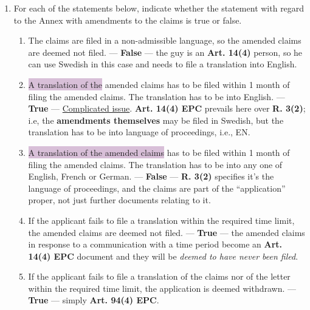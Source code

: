 \documentclass{report}
\begin{document}
\begin{enumerate}[label=\textbf{Answer \arabic*}]
\begin{enumerate}[label=\textbf{Answer \arabic*}]
\begin{enumerate}[label=(\alph*)]
        \item For each of the statements below, indicate whether the statement with regard to the Annex with amendments to the claims is true or false.
        \begin{enumerate}[label={(\alph{enumi}.\arabic*)}]
            \item The claims are filed in a non-admissible language, so the amended claims are deemed not filed. --- \textbf{False} --- the guy is an \textbf{Art. 14(4)} person, so he can use Swedish in this case and needs to file a translation into English.
            \item \colorbox{Thistle}{A translation of the} amended claims has to be filed within 1 month of filing the amended claims. The translation has to be into English. --- \textbf{True} --- \underline{Complicated issue}. \textbf{Art. 14(4) EPC} prevails here over \textbf{R. 3(2)}; i.e, the \textbf{amendments themselves} may be filed in Swedish, but the translation has to be into language of proceedings, i.e., \textsc{EN}.
            \item \colorbox{Thistle}{A translation of the amended claims} has to be filed within 1 month of filing the amended claims. The translation has to be into any one of English, French or German. --- \textbf{False} --- \textbf{R. 3(2)} specifies it's the language of proceedings, and the claims are part of the ``application'' proper, not just further documents relating to it.
            \item If the applicant fails to file a translation within the required time limit, the amended claims are deemed not filed. --- \textbf{True} --- the amended claims in response to a communication with a time period become an \textbf{Art. 14(4) EPC} document and they will be \textit{deemed to have never been filed}.
            \item If the applicant fails to file a translation of the claims nor of the letter within the required time limit, the application is deemed withdrawn. --- \textbf{True} --- simply \textbf{Art. 94(4) EPC}.
        \end{enumerate}
        

\end{enumerate}
\end{enumerate}
\end{enumerate}
\end{document}
